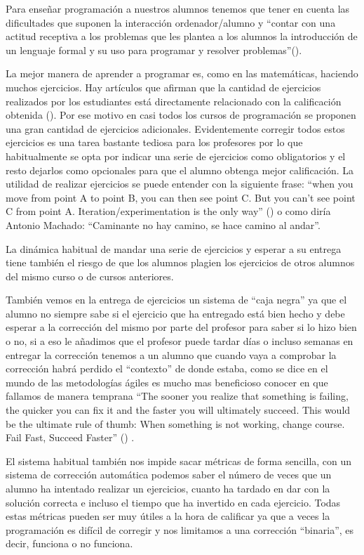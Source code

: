 \bigskip
Para enseñar programación a nuestros alumnos tenemos que tener en cuenta las dificultades que suponen la interacción ordenador/alumno y ``contar con una actitud receptiva a los problemas que les plantea a los alumnos la introducción de un lenguaje formal y su uso para programar y resolver problemas''(\cite{vitale_psycopedagogical_1990}).

\bigskip
La mejor manera de aprender a programar es, como en las matemáticas, haciendo muchos ejercicios. Hay artículos que afirman que la cantidad de ejercicios realizados por los estudiantes  está directamente relacionado con la calificación obtenida (\cite{qian_teachers_2019}). Por ese motivo en casi todos los cursos de programación se proponen una gran cantidad de ejercicios adicionales. Evidentemente corregir todos estos ejercicios es una tarea bastante tediosa para los profesores por lo que habitualmente se opta por indicar una serie de ejercicios como obligatorios y el resto dejarlos como opcionales para que el alumno obtenga mejor calificación. La utilidad de realizar ejercicios se puede entender con la siguiente frase: ``when you move from point A to point B, you can then see point C. But you can’t see point C from point A. Iteration/experimentation is the only way'' (\cite{ismail_exponential_2018}) o como diría Antonio Machado: ``Caminante no hay camino, se hace camino al andar''.

\bigskip
La dinámica habitual de mandar una serie de ejercicios y esperar a su entrega tiene también el riesgo de que los alumnos plagien los ejercicios de otros alumnos del mismo curso o de cursos anteriores.

\bigskip
También vemos en la entrega de ejercicios un sistema de ``caja negra'' ya que el alumno no siempre sabe si el ejercicio que ha entregado está bien hecho y debe esperar a la corrección del mismo por parte del profesor para saber si lo hizo bien o no, si a eso le añadimos que el profesor puede tardar días o incluso semanas en entregar la corrección tenemos a un alumno que cuando vaya a comprobar la corrección habrá perdido el ``contexto'' de donde estaba, como se dice en el mundo de las metodologías ágiles es mucho mas beneficioso conocer en que fallamos de manera temprana ``The sooner you realize that something is failing, the quicker you can fix it and the faster you will ultimately succeed. This would be the ultimate rule of thumb: When something is not working, change course. Fail Fast, Succeed Faster'' (\cite{godse_fail_2013}) .

\bigskip
El sistema habitual también nos impide sacar métricas de forma sencilla, con un sistema de corrección automática podemos saber el número de veces que un alumno ha intentado realizar un ejercicios, cuanto ha tardado en dar con la solución correcta e incluso el tiempo que ha invertido en cada ejercicio. Todas estas métricas pueden ser muy útiles a la hora de calificar ya que a veces la programación es difícil de corregir y nos limitamos a una corrección ``binaria'', es decir, funciona o no funciona.

